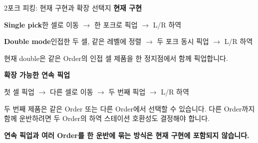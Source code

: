 \documentclass[aspectratio=169,11pt]{beamer}
\newcommand{\warn}[1]{{\color{orange}\bfseries #1}}
\begin{document}
\begin{frame}{2포크 피킹: 현재 구현과 확장 선택지}
{\color{teal}\bfseries 현재 구현}\par\vspace{0.15cm}
\textbf{Single pick}\quad 한 셀로 이동 $\rightarrow$ 한 포크로 픽업 $\rightarrow$ L/R 하역\par\vspace{0.12cm}
\textbf{Double mode}\quad 인접한 두 셀, 같은 레벨에 정렬 $\rightarrow$ 두 포크 동시 픽업 $\rightarrow$ L/R 하역\par
\small\color{muted}현재 double은 같은 Order의 인접 셀 제품을 한 정지점에서 함께 픽업합니다.\par\vspace{0.35cm}
{\color{gold}\bfseries 확장 가능한 연속 픽업}\par\vspace{0.15cm}
\begin{center}\large 첫 셀 픽업 $\rightarrow$ 다른 셀로 이동 $\rightarrow$ 두 번째 픽업 $\rightarrow$ L/R 하역\end{center}
두 번째 제품은 같은 Order 또는 다른 Order에서 선택할 수 있습니다. 다른 Order까지 함께 운반하려면 두 Order의 하역 스테이션 호환성도 결정해야 합니다.\par\vspace{0.2cm}
\warn{연속 픽업과 여러 Order를 한 운반에 묶는 방식은 현재 구현에 포함되지 않습니다.}
\end{frame}
\end{document}
